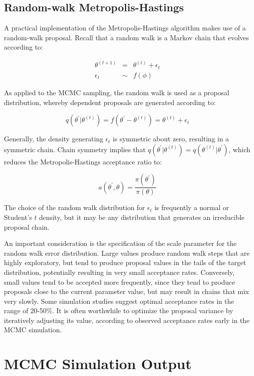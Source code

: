 \documentclass[]{book}
\begin{document}
\subsection{Random-walk Metropolis-Hastings}

A practical implementation of the Metropolis-Hastings algorithm makes use of a random-walk proposal. Recall that a random walk is a Markov chain that evolves according to:

\begin{eqnarray*}
\theta^{(t+1)} &=& \theta^{(t)} + \epsilon_t \\
\epsilon_t &\sim& f(\phi)
\end{eqnarray*}

As applied to the MCMC sampling, the random walk is used as a proposal distribution, whereby dependent proposals are generated according to:

\[
q(\theta^{\prime} | \theta^{(t)}) = f(\theta^{\prime} - \theta^{(t)}) = \theta^{(t)} + \epsilon_t
\]

Generally, the density generating $\epsilon_t$ is symmetric about zero, resulting in a symmetric chain. Chain symmetry implies that $q(\theta^{\prime} | \theta^{(t)}) = q(\theta^{(t)} | \theta^{\prime})$, which reduces the Metropolis-Hastings acceptance ratio to:

\[
a(\theta^{\prime},\theta) = \frac{\pi(\theta^{\prime})}{\pi(\theta)}
\]

The choice of the random walk distribution for $\epsilon_t$ is frequently a normal or Student's $t$ density, but it may be any distribution that generates an irreducible proposal chain.

An important consideration is the specification of the scale parameter for the random walk error distribution. Large values produce random walk steps that are highly exploratory, but tend to produce proposal values in the tails of the target distribution, potentially resulting in very small acceptance rates. Conversely, small values tend to be accepted more frequently, since they tend to produce proposals close to the current parameter value, but may result in chains that mix very slowly. Some simulation studies suggest optimal acceptance rates in the range of 20-50\%. It is often worthwhile to optimize the proposal variance by iteratively adjusting its value, according to observed acceptance rates early in the MCMC simulation.

\section{MCMC Simulation Output}
\end{document}

